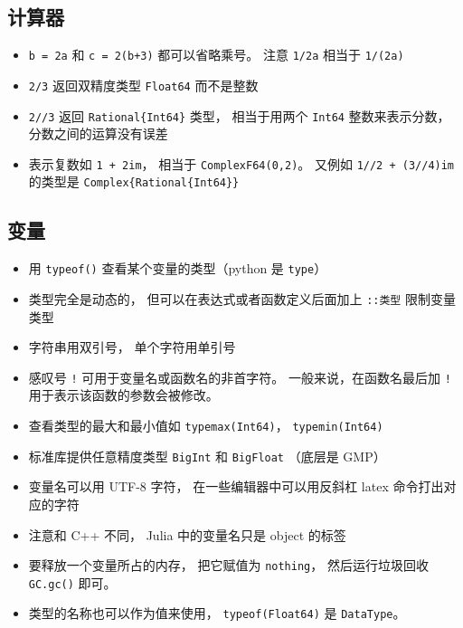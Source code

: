 \subsection{计算器}
\begin{itemize}
\item \verb`b = 2a` 和 \verb`c = 2(b+3)` 都可以省略乘号。 注意 \verb`1/2a` 相当于 \verb`1/(2a)`
\item \verb`2/3` 返回双精度类型 \verb`Float64` 而不是整数
\item \verb`2//3` 返回 \verb`Rational{Int64}` 类型， 相当于用两个 \verb`Int64` 整数来表示分数， 分数之间的运算没有误差
\item 表示复数如 \verb`1 + 2im`， 相当于 \verb`ComplexF64(0,2)`。 又例如 \verb`1//2 + (3//4)im` 的类型是 \verb`Complex{Rational{Int64}}`
\end{itemize}

\subsection{变量}
\begin{itemize}
\item 用 \verb`typeof()` 查看某个变量的类型（python 是 \verb`type`）
\item 类型完全是动态的， 但可以在表达式或者函数定义后面加上 \verb`::类型` 限制变量类型
\item 字符串用双引号， 单个字符用单引号
\item 感叹号 \verb`!` 可用于变量名或函数名的非首字符。 一般来说，在函数名最后加 \verb`!` 用于表示该函数的参数会被修改。
\item 查看类型的最大和最小值如 \verb`typemax(Int64)`， \verb`typemin(Int64)`
\item 标准库提供任意精度类型 \verb`BigInt` 和 \verb`BigFloat` （底层是 GMP）
\item 变量名可以用 UTF-8 字符， 在一些编辑器中可以用反斜杠 latex 命令打出对应的字符
\item 注意和 C++ 不同， Julia 中的变量名只是 object 的标签
\item 要释放一个变量所占的内存， 把它赋值为 \verb`nothing`， 然后运行垃圾回收 \verb`GC.gc()` 即可。
\item 类型的名称也可以作为值来使用， \verb`typeof(Float64)` 是 \verb`DataType`。
\end{itemize}

